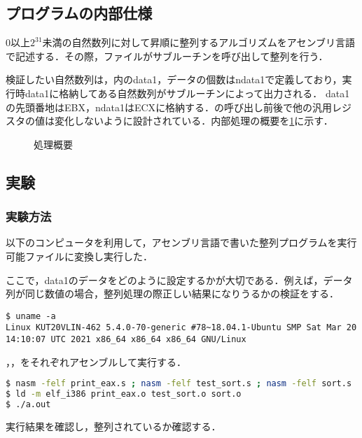 \subsection{プログラムの内部仕様}
\(0\)以上\(2^{31}\)未満の自然数列に対して昇順に整列するアルゴリズムをアセンブリ言語で記述する．その際，\testsort ファイルが\sort サブルーチンを呼び出して整列を行う．\par
検証したい自然数列は，\testsort 内の{\ttfamily data1}，データの個数は{\ttfamily ndata1}で定義しており，\testsort 実行時{\ttfamily data1}に格納してある自然数列が\print サブルーチンによって出力される．
{\ttfamily data1}の先頭番地は{\ttfamily EBX}，{\ttfamily ndata1}は{\ttfamily ECX}に格納する．\sort の呼び出し前後で他の汎用レジスタの値は変化しないように設計されている．内部処理の概要を\ref{kadai1:abs}に示す．
\begin{figure}[h]
    \centering
    \caption{処理概要}
    \label{kadai1:abs}
\end{figure}
\subsection{実験}
\subsubsection{実験方法}
以下のコンピュータを利用して，アセンブリ言語で書いた整列プログラムを実行可能ファイルに変換し実行した．\par
ここで，{\ttfamily data1}のデータをどのように設定するかが大切である．例えば，データ列が同じ数値の場合，整列処理の際正しい結果になりうるかの検証をする．
\begin{lstlisting}[frame={single},numbers={none},breakindent={0pt},language={}]
$ uname -a
Linux KUT20VLIN-462 5.4.0-70-generic #78~18.04.1-Ubuntu SMP Sat Mar 20 14:10:07 UTC 2021 x86_64 x86_64 x86_64 GNU/Linux
\end{lstlisting}
，\testsort，をそれぞれアセンブルして実行する．
\begin{lstlisting}[frame={single},numbers={none},breakindent={0pt},language={Bash}]
$ nasm -felf print_eax.s ; nasm -felf test_sort.s ; nasm -felf sort.s
$ ld -m elf_i386 print_eax.o test_sort.o sort.o
$ ./a.out
\end{lstlisting}
実行結果を確認し，整列されているか確認する．
